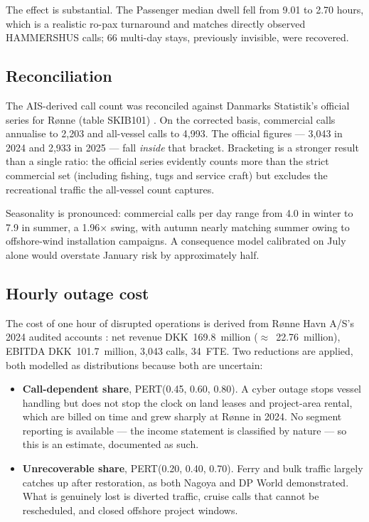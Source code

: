 \documentclass[conference]{IEEEtran}
\newcommand{\eur}{\mbox{\texteuro}}
\begin{document}
The effect is substantial. The Passenger median dwell fell from 9.01 to 2.70 hours,
which is a realistic ro-pax turnaround and matches directly observed HAMMERSHUS
calls; 66 multi-day stays, previously invisible, were recovered.

\subsection{Reconciliation}

The AIS-derived call count was reconciled against Danmarks Statistik's official
series for Rønne (table SKIB101) \cite{dst}. On the corrected basis, commercial
calls annualise to 2{,}203 and all-vessel calls to 4{,}993. The official figures ---
3{,}043 in 2024 and 2{,}933 in 2025 --- fall \emph{inside} that bracket. Bracketing
is a stronger result than a single ratio: the official series evidently counts more
than the strict commercial set (including fishing, tugs and service craft) but
excludes the recreational traffic the all-vessel count captures.

Seasonality is pronounced: commercial calls per day range from 4.0 in winter to 7.9
in summer, a 1.96$\times$ swing, with autumn nearly matching summer owing to
offshore-wind installation campaigns. A consequence model calibrated on July alone
would overstate January risk by approximately half.

\subsection{Hourly outage cost}

The cost of one hour of disrupted operations is derived from Rønne Havn A/S's 2024
audited accounts \cite{ronne2024}: net revenue DKK~169.8~million
($\approx$~\eur{}22.76~million), EBITDA DKK~101.7~million, 3{,}043 calls, 34~FTE.
Two reductions are applied, both modelled as distributions because both are
uncertain:

\begin{itemize}
\item \textbf{Call-dependent share}, PERT(0.45, 0.60, 0.80). A cyber outage stops
vessel handling but does not stop the clock on land leases and project-area rental,
which are billed on time and grew sharply at Rønne in 2024. No segment reporting is
available --- the income statement is classified by nature --- so this is an
estimate, documented as such.
\item \textbf{Unrecoverable share}, PERT(0.20, 0.40, 0.70). Ferry and bulk traffic
largely catches up after restoration, as both Nagoya and DP World demonstrated.
What is genuinely lost is diverted traffic, cruise calls that cannot be
rescheduled, and closed offshore project windows.
\end{itemize}
\end{document}
